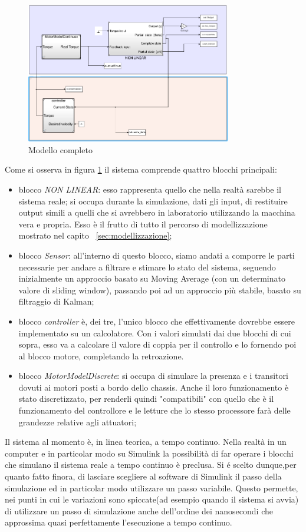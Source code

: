 \begin{figure}[H]
	\centering   	
	\includegraphics[width=0.8\textwidth]{Immagini/simulink_model_continuos.png}
	\caption{Modello completo}
	\label{fig:simulink}
\end{figure}
Come si osserva in figura \ref{fig:simulink} il sistema comprende quattro blocchi principali:
\begin{itemize}
	\item blocco \textit{NON LINEAR}: esso rappresenta quello che nella realtà sarebbe il sistema reale; si occupa durante la simulazione, dati gli input, di restituire output simili a quelli che si avrebbero in laboratorio utilizzando la macchina vera e propria.
	Esso è il frutto di tutto il percorso di modellizzazione mostrato nel capito ~\ref{sec:modellizzazione};
	\item blocco \textit{Sensor}: all'interno di questo blocco, siamo andati a comporre le parti necessarie per andare a filtrare e stimare lo stato del sistema, seguendo inizialmente un approccio basato su Moving Average (con un determinato valore di sliding window), passando poi ad un approccio più stabile, basato su filtraggio di Kalman;
	\item blocco \textit{controller} è, dei tre, l'unico blocco che effettivamente dovrebbe essere implementato su un calcolatore. Con i valori simulati dai due blocchi di cui sopra, esso va a calcolare il valore di coppia per il controllo e lo fornendo poi al blocco motore, completando la retroazione.
	\item blocco \textit{MotorModelDiscrete}: si occupa di simulare la presenza e i transitori dovuti ai motori posti a bordo dello chassis.
	Anche il loro funzionamento è stato discretizzato, per renderli quindi "compatibili" con quello che è il funzionamento del controllore e le letture che lo stesso processore farà delle grandezze relative agli attuatori;
\end{itemize}
Il sistema al momento è, in linea teorica, a tempo continuo. Nella realtà in un computer e in particolar modo su Simulink la possibilità di far operare i blocchi che simulano il sistema reale a tempo continuo è preclusa.
Si é scelto dunque,per quanto fatto finora, di lasciare scegliere al software di Simulink il passo della simulazione ed in particolar modo utilizzare un passo variabile. Questo permette, nei punti in cui le variazioni sono spiccate(ad esempio quando il sistema si avvia) di utilizzare un passo di simulazione anche dell'ordine dei nanosecondi che approssima quasi perfettamente l'esecuzione a tempo continuo.

